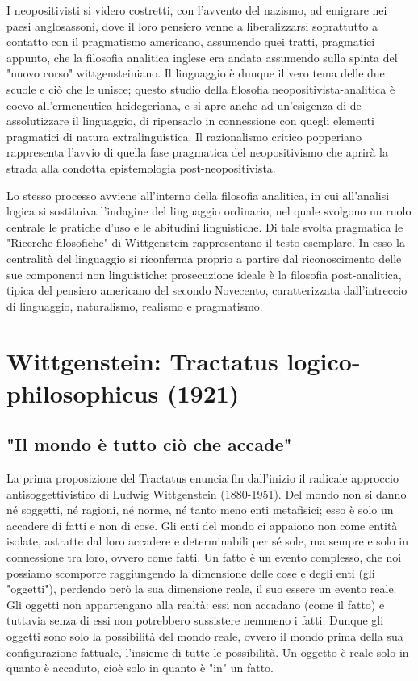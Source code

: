 I neopositivisti
si videro costretti, con l'avvento del nazismo,
ad emigrare nei paesi anglosassoni, dove il loro
pensiero venne a liberalizzarsi soprattutto
a contatto con il pragmatismo americano,
assumendo quei tratti, pragmatici appunto, che
la filosofia analitica inglese era andata
assumendo sulla spinta del "nuovo corso"
wittgensteiniano.
Il linguaggio è dunque il vero tema delle due scuole e ciò
che le unisce; questo studio della filosofia
neopositivista-analitica è coevo all'ermeneutica
heidegeriana, e si apre anche ad un'esigenza
di de-assolutizzare il linguaggio, di ripensarlo
in connessione con quegli elementi pragmatici di
natura extralinguistica. Il razionalismo critico
popperiano rappresenta l'avvio di quella fase
pragmatica del neopositivismo che aprirà la
strada alla condotta epistemologia post-neopositivista.


Lo stesso processo avviene all'interno della filosofia
analitica, in cui all'analisi logica si sostituiva
l'indagine del linguaggio ordinario, nel quale
svolgono un ruolo centrale le pratiche d'uso e le
abitudini linguistiche. Di tale svolta pragmatica
le "Ricerche filosofiche" di Wittgenstein
rappresentano il testo esemplare. In esso la
centralità del linguaggio si riconferma proprio
a partire dal riconoscimento delle sue
componenti non linguistiche: prosecuzione
ideale è la filosofia post-analitica, tipica del
pensiero americano del secondo Novecento,
caratterizzata dall'intreccio di linguaggio,
naturalismo, realismo e pragmatismo.

\section{Wittgenstein: Tractatus logico-philosophicus (1921)}

\subsection{"Il mondo è tutto ciò che accade"}

La prima proposizione del Tractatus enuncia
fin dall'inizio il radicale approccio antisoggettivistico
di Ludwig Wittgenstein (1880-1951). Del
mondo non si danno né soggetti, né ragioni, né norme,
né tanto meno enti metafisici; esso è solo un accadere
di fatti e non di cose. Gli  enti del mondo ci appaiono
non come entità isolate, astratte dal loro accadere e
determinabili per sé sole, ma sempre e solo in connessione
tra loro, ovvero come fatti. Un fatto è un evento
complesso, che noi possiamo scomporre raggiungendo
la dimensione delle cose e degli enti (gli "oggetti"),
perdendo però la sua dimensione reale, il suo essere
un evento reale. Gli oggetti non appartengano
alla realtà: essi non accadano (come il fatto) e tuttavia
senza di essi non potrebbero sussistere nemmeno i
fatti. Dunque gli oggetti sono solo la possibilità
del mondo reale, ovvero il mondo prima della sua
configurazione fattuale, l'insieme di tutte le
possibilità. Un oggetto è reale solo
in quanto è accaduto, cioè solo in quanto è
"in" un fatto.

